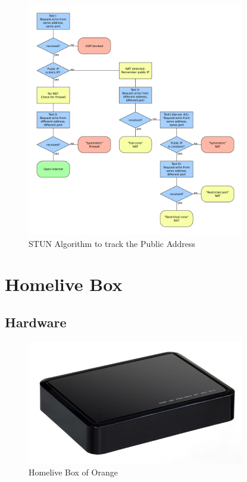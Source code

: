 \begin{figure}[htbp]
	\centering
		\includegraphics[width=9.5cm]{Figures/STUN_Algorithm.png}
	\caption[STUN Algorithm to track the Public Address]{STUN Algorithm to track the Public Address}
	\label{fig:stunalgorithm}
\end{figure}
\section{Homelive Box}


\subsection{Hardware}

\begin{figure}[htbp]
	\centering
		\includegraphics[width=9.5cm]{Figures/Orange-Home-Live.jpg}
	\caption[Homelive Box of Orange]{Homelive Box of Orange}
	\label{fig:homelivebox}
\end{figure}

